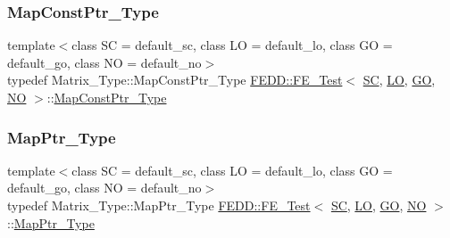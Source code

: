 \mbox{\label{classFEDD_1_1FE__Test_ad09d94cdf8e7574fc9b6d1648fa18826}} 
\subsubsection{\texorpdfstring{Map\+Const\+Ptr\+\_\+\+Type}{MapConstPtr\_Type}}
{\footnotesize\ttfamily template$<$class SC  = default\+\_\+sc, class LO  = default\+\_\+lo, class GO  = default\+\_\+go, class NO  = default\+\_\+no$>$ \\
typedef Matrix\+\_\+\+Type\+::\+Map\+Const\+Ptr\+\_\+\+Type \hyperlink{classFEDD_1_1FE__Test}{F\+E\+D\+D\+::\+F\+E\+\_\+\+Test}$<$ \hyperlink{fe__test__laplace_8cpp_a79c7e86a57edbb2a5a53242bcd04e41e}{SC}, \hyperlink{fe__test__laplace_8cpp_ad6a38c9f07d3fd633eefca5bccad8410}{LO}, \hyperlink{fe__test__laplace_8cpp_afa2946b509009b4f45eb04bd8c5b27d9}{GO}, \hyperlink{fe__test__laplace_8cpp_a5e24f37b28787429872b6ecb1d0417ce}{NO} $>$\+::\hyperlink{classFEDD_1_1FE__Test_ad09d94cdf8e7574fc9b6d1648fa18826}{Map\+Const\+Ptr\+\_\+\+Type}}

\mbox{\label{classFEDD_1_1FE__Test_af41d3f3475a5ac2e0c7d3aab1b06102b}} 
\subsubsection{\texorpdfstring{Map\+Ptr\+\_\+\+Type}{MapPtr\_Type}}
{\footnotesize\ttfamily template$<$class SC  = default\+\_\+sc, class LO  = default\+\_\+lo, class GO  = default\+\_\+go, class NO  = default\+\_\+no$>$ \\
typedef Matrix\+\_\+\+Type\+::\+Map\+Ptr\+\_\+\+Type \hyperlink{classFEDD_1_1FE__Test}{F\+E\+D\+D\+::\+F\+E\+\_\+\+Test}$<$ \hyperlink{fe__test__laplace_8cpp_a79c7e86a57edbb2a5a53242bcd04e41e}{SC}, \hyperlink{fe__test__laplace_8cpp_ad6a38c9f07d3fd633eefca5bccad8410}{LO}, \hyperlink{fe__test__laplace_8cpp_afa2946b509009b4f45eb04bd8c5b27d9}{GO}, \hyperlink{fe__test__laplace_8cpp_a5e24f37b28787429872b6ecb1d0417ce}{NO} $>$\+::\hyperlink{classFEDD_1_1FE__Test_af41d3f3475a5ac2e0c7d3aab1b06102b}{Map\+Ptr\+\_\+\+Type}}

